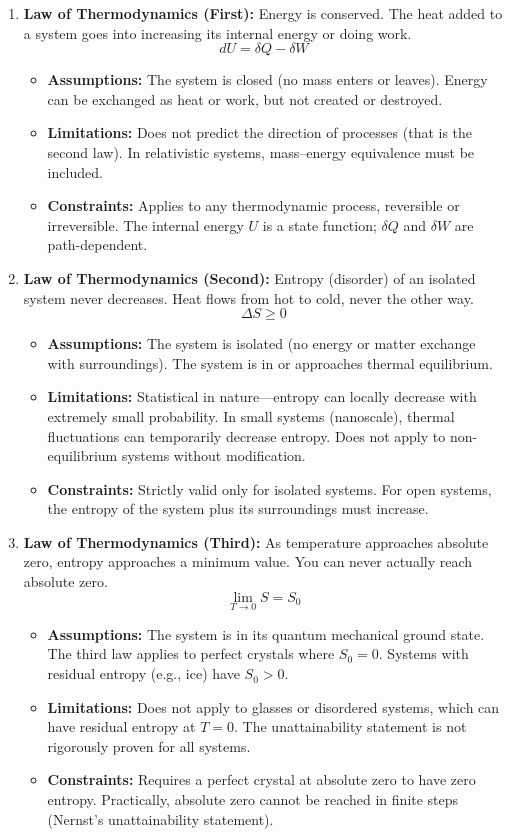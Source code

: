 \begin{enumerate}
\item \textbf{Law of Thermodynamics (First):} Energy is conserved. The heat added to a system goes into increasing its internal energy or doing work.
\[
dU=\delta Q-\delta W
\]
\begin{itemize}
\item \textbf{Assumptions:} The system is closed (no mass enters or leaves). Energy can be exchanged as heat or work, but not created or destroyed.
\item \textbf{Limitations:} Does not predict the direction of processes (that is the second law). In relativistic systems, mass--energy equivalence must be included.
\item \textbf{Constraints:} Applies to any thermodynamic process, reversible or irreversible. The internal energy $U$ is a state function; $\delta Q$ and $\delta W$ are path-dependent.
\end{itemize}

\item \textbf{Law of Thermodynamics (Second):} Entropy (disorder) of an isolated system never decreases. Heat flows from hot to cold, never the other way.
\[
\Delta S\geq 0
\]
\begin{itemize}
\item \textbf{Assumptions:} The system is isolated (no energy or matter exchange with surroundings). The system is in or approaches thermal equilibrium.
\item \textbf{Limitations:} Statistical in nature---entropy can locally decrease with extremely small probability. In small systems (nanoscale), thermal fluctuations can temporarily decrease entropy. Does not apply to non-equilibrium systems without modification.
\item \textbf{Constraints:} Strictly valid only for isolated systems. For open systems, the entropy of the system plus its surroundings must increase.
\end{itemize}

\item \textbf{Law of Thermodynamics (Third):} As temperature approaches absolute zero, entropy approaches a minimum value. You can never actually reach absolute zero.
\[
\lim_{T\to 0}S=S_0
\]
\begin{itemize}
\item \textbf{Assumptions:} The system is in its quantum mechanical ground state. The third law applies to perfect crystals where $S_0=0$. Systems with residual entropy (e.g., ice) have $S_0>0$.
\item \textbf{Limitations:} Does not apply to glasses or disordered systems, which can have residual entropy at $T=0$. The unattainability statement is not rigorously proven for all systems.
\item \textbf{Constraints:} Requires a perfect crystal at absolute zero to have zero entropy. Practically, absolute zero cannot be reached in finite steps (Nernst's unattainability statement).
\end{itemize}


\end{enumerate}
